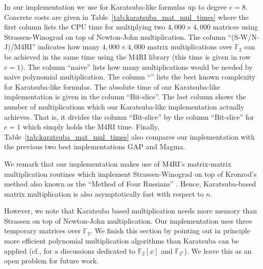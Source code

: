 \documentclass{sig-alternate}
\newcommand{\ring}[1]{\mathbb{#1}}
\newcommand{\FZ}{\ensuremath{\ring{F}_2}\xspace}
\newcommand{\FZE}{\ensuremath{\ring{F}_{2^e}}\xspace}
\begin{document}
In our implementation we use \cite{M05} for Karatsuba-like formulas up to degree $e=8$. Concrete costs are given in Table~\ref{tab:karatsuba_mat_mul_times} where the first column lists the CPU time for multiplying two $4,000 \times 4,000$ matrices using Strassen-Winograd on top of Newton-John multiplication. The column ``(S-W/N-J)/M4RI'' indicates how many $4,000 \times 4,000$ matrix multiplications over \FZ can be achieved in the same time using the M4RI library (this time is given in row $e=1$). The column ``naive'' lists how many multiplications would be needed by naive polynomial multiplication. The column ``\cite{M05}'' lists the best known complexity for Karatsuba-like formulas. The absolute time of our Karatsuba-like implementation is given in the column ``Bit-slice''. The last column shows the number of multiplications which our Karatsuba-like implementation actually achieves. That is, it divides the column ``Bit-slice'' by the column ``Bit-slice'' for $e=1$ which simply holds the M4RI time. Finally, Table~\ref{tab:karatsuba_mat_mul_times} also compares our implementation with the previous two best implementations GAP and Magma.

We remark that our implementation makes use of M4RI's matrix-matrix multiplication routines which implement Strassen-Winograd on top of Kronrod's method also known as the ``Method of Four Russians'' \cite{matmulgf2}. Hence, Karatsuba-based matrix multiplication is also asymptotically fast with respect to $n$.

However, we note that Karatsuba based multiplication needs more memory than Strassen on top of Newton-John multiplication. Our implementation uses three temporary matrices over \FZ. We finish this section by pointing out in principle more efficient polynomial multiplication algorithms than Karatsuba can be applied (cf., \cite{Brent:2008:FMG:1789715.1789728,barbulescu-detrey-estibals-zimmermann:2012} for a discussions dedicated to $\FZ[x]$ and \FZE). We leave this as an open problem for future work.
\end{document}
